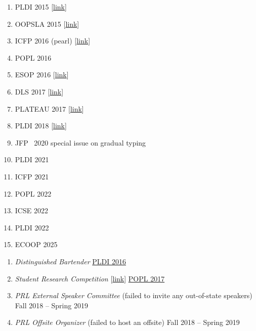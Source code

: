 \documentclass{article}
\begin{document}
\begin{enumerate}
\item PLDI 2015 [\href{https://cs.utah.edu/~blg/cv/failures/pldi-2015-reject.pdf}{link}]
\item OOPSLA 2015 [\href{https://cs.utah.edu/~blg/cv/failures/oopsla-2015-reject.pdf}{link}]
\item ICFP 2016 (pearl) [\href{https://cs.utah.edu/~blg/cv/failures/icfp-2016-reject.pdf}{link}]
\item POPL 2016
\item ESOP 2016 [\href{https://cs.utah.edu/~blg/resources/type-tailoring.pdf}{link}]
\item DLS 2017 [\href{https://cs.utah.edu/~blg/resources/dls-2017-reject.pdf}{link}]
\item PLATEAU 2017 [\href{https://cs.utah.edu/~blg/cv/failures/plateau-2017-reject.pdf}{link}]
\item PLDI 2018 [\href{https://cs.utah.edu/~blg/cv/failures/pldi-2018-reject.pdf}{link}]
\item JFP ~2020 special issue on gradual typing
\item PLDI 2021 %
\item ICFP 2021 %
\item POPL 2022 %
\item ICSE 2022 %
\item PLDI 2022 %
\item ECOOP 2025 %
\end{enumerate}

\begin{enumerate}
\item \emph{Distinguished Bartender} \hfill \href{http://conf.researchr.org/home/PLDI-2016}{PLDI 2016}
\item \emph{Student Research Competition} [\href{https://cs.utah.edu/~blg/failures/src-2017-reject.pdf}{link}] \hfill \href{https://popl17.sigplan.org/track/POPL-2017-src}{POPL 2017}
\item \emph{PRL External Speaker Committee} (failed to invite any out-of-state speakers)  \hfill {Fall 2018 -- Spring 2019}
\item \emph{PRL Offsite Organizer} (failed to host an offsite) \hfill {Fall 2018 -- Spring 2019}
\end{enumerate}
\end{document}
